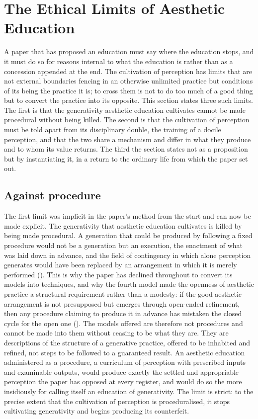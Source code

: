 \section{The Ethical Limits of Aesthetic Education}
\label{p23:sec:limits}

\noindent
A paper that has proposed an education must say where the education stops, and it must do so for reasons internal to what the education is rather than as a concession appended at the end. The cultivation of perception has limits that are not external boundaries fencing in an otherwise unlimited practice but conditions of its being the practice it is; to cross them is not to do too much of a good thing but to convert the practice into its opposite. This section states three such limits. The first is that the generativity aesthetic education cultivates cannot be made procedural without being killed. The second is that the cultivation of perception must be told apart from its disciplinary double, the training of a docile perception, and that the two share a mechanism and differ in what they produce and to whom its value returns. The third the section states not as a proposition but by instantiating it, in a return to the ordinary life from which the paper set out.

\subsection{Against procedure}
\label{p23:sub:limits-procedure}

The first limit was implicit in the paper's method from the start and can now be made explicit. The generativity that aesthetic education cultivates is killed by being made procedural. A generation that could be produced by following a fixed procedure would not be a generation but an execution, the enactment of what was laid down in advance, and the field of contingency in which alone perception generates would have been replaced by an arrangement in which it is merely performed (). This is why the paper has declined throughout to convert its models into techniques, and why the fourth model made the openness of aesthetic practice a structural requirement rather than a modesty: if the good aesthetic arrangement is not presupposed but emerges through open-ended refinement, then any procedure claiming to produce it in advance has mistaken the closed cycle for the open one (). The models offered are therefore not procedures and cannot be made into them without ceasing to be what they are. They are descriptions of the structure of a generative practice, offered to be inhabited and refined, not steps to be followed to a guaranteed result. An aesthetic education administered as a procedure, a curriculum of perception with prescribed inputs and examinable outputs, would produce exactly the settled and appropriable perception the paper has opposed at every register, and would do so the more insidiously for calling itself an education of generativity. The limit is strict: to the precise extent that the cultivation of perception is proceduralised, it stops cultivating generativity and begins producing its counterfeit.

